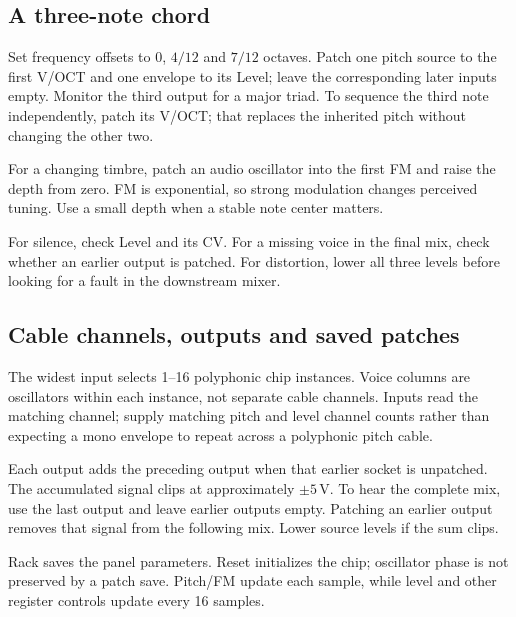 \subsection{A three-note chord}
Set frequency offsets to 0, $4/12$ and $7/12$ octaves. Patch one pitch source
to the first V/OCT and one envelope to its Level; leave the corresponding
later inputs empty. Monitor the third output for a major triad. To sequence
the third note independently, patch its V/OCT; that replaces the inherited
pitch without changing the other two.

For a changing timbre, patch an audio oscillator into the first FM and raise
the depth from zero. FM is exponential, so strong modulation changes perceived
tuning. Use a small depth when a stable note center matters.

For silence, check Level and its CV. For a missing voice in the final mix,
check whether an earlier output is patched. For distortion, lower all three
levels before looking for a fault in the downstream mixer.

\subsection{Cable channels, outputs and saved patches}
The widest input selects 1--16 polyphonic chip instances. Voice columns are
oscillators within each instance, not separate cable channels. Inputs read
the matching channel; supply matching pitch and level channel counts rather
than expecting a mono envelope to repeat across a polyphonic pitch cable.

Each output adds the preceding output when that earlier socket is unpatched.
The accumulated signal clips at approximately $\pm5$\,V. To hear the complete
mix, use the last output and leave earlier outputs empty. Patching an earlier
output removes that signal from the following mix. Lower source levels if
the sum clips.

Rack saves the panel parameters. Reset initializes the chip; oscillator
phase is not preserved by a patch save. Pitch/FM update each sample, while
level and other register controls update every 16 samples.
